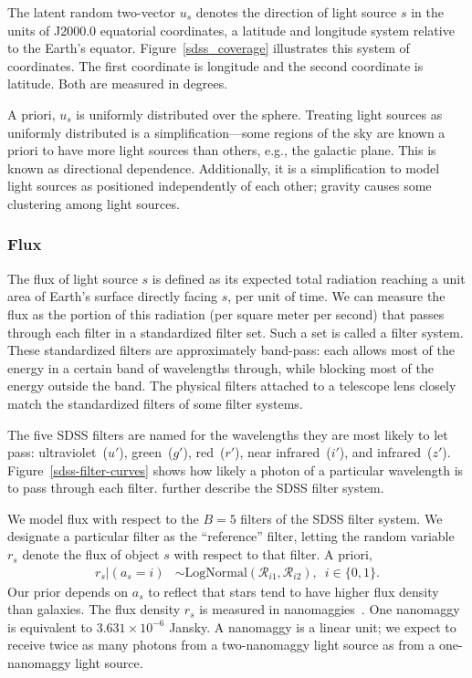 The latent random two-vector $u_s$ denotes the direction of light source $s$
in the units of J2000.0 equatorial coordinates, a latitude and longitude system relative to the Earth's equator.
Figure~\ref{sdss_coverage} illustrates this system of coordinates.
The first coordinate is longitude and the second coordinate is latitude.
Both are measured in degrees.

A priori, $u_s$ is uniformly distributed over the sphere.
Treating light sources as uniformly distributed is a simplification---some regions of the sky are known a priori to have more light sources than others, e.g., the galactic plane. This is known as directional dependence. Additionally, it is a simplification to model light sources as positioned independently of each other; gravity causes some clustering among light sources.


\subsubsection{Flux}
\label{flux}

The flux of light source $s$ is defined as its expected total radiation reaching a unit area of Earth's surface directly facing $s$, per unit of time. We can measure the flux as the portion of this radiation (per square meter per second) that passes through each filter in a standardized filter set. Such a set is called a filter system. These standardized filters are approximately band-pass: each allows most of the energy in a certain band of wavelengths through, while blocking most of the energy outside the band.
The physical filters attached to a telescope lens closely match the standardized filters of some filter systems.

The five SDSS filters are named for the wavelengths they are most likely to let pass:
ultraviolet~($u'$), green~($g'$), red~($r'$), near infrared~($i'$), and infrared~($z'$).
Figure~\ref{sdss-filter-curves} shows how likely a photon of a particular wavelength is to pass through each filter.
\cite{fukugita1996sloan} further describe the SDSS filter system.

We model flux with respect to the $B = 5$ filters of the SDSS filter system.
We designate a particular filter as the ``reference'' filter, letting the
random variable $r_s$ denote the flux of object $s$ with respect to that
filter. A priori,
\begin{align}
r_s | (a_s = i) &\sim \mathrm{LogNormal}(\mathcal R_{i1}, \mathcal R_{i2}),\,\,\, i \in \{0,1\}.
\end{align}
Our prior depends on $a_s$ to reflect that stars tend to have higher flux density than galaxies.
The flux density $r_s$ is measured in nanomaggies~\citep{sdssglossary,nanomaggies}.
One nanomaggy is equivalent to $3.631 \times 10^{-6}$ Jansky.
A nanomaggy is a linear unit; we expect to receive twice as many photons from a two-nanomaggy light source as from a one-nanomaggy light source.

